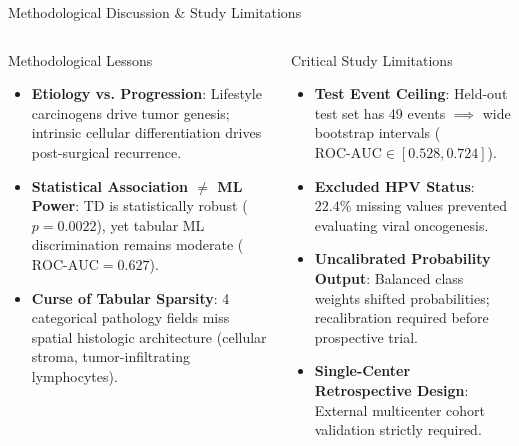 \documentclass[10pt,aspectratio=169,xcolor={table,dvipsnames}]{beamer}
\newcommand{\ROC}{\text{ROC-AUC}}
\begin{document}
\begin{frame}{Methodological Discussion \& Study Limitations}
  \begin{columns}[t]
      \begin{block}{Methodological Lessons}
        \begin{itemize}\setlength{\itemsep}{3pt}
          \item \textbf{Etiology vs. Progression}: Lifestyle carcinogens drive tumor genesis; intrinsic cellular differentiation drives post-surgical recurrence.
          \item \textbf{Statistical Association $\neq$ ML Power}: TD is statistically robust ($p=0.0022$), yet tabular ML discrimination remains moderate ($\ROC = 0.627$).
          \item \textbf{Curse of Tabular Sparsity}: 4 categorical pathology fields miss spatial histologic architecture (cellular stroma, tumor-infiltrating lymphocytes).
        \end{itemize}
      \end{block}

      \begin{alertblock}{Critical Study Limitations}
        \begin{itemize}\setlength{\itemsep}{2pt}
          \item \textbf{Test Event Ceiling}: Held-out test set has 49 events $\implies$ wide bootstrap intervals ($\ROC \in [0.528, 0.724]$).
          \item \textbf{Excluded HPV Status}: $22.4\%$ missing values prevented evaluating viral oncogenesis.
          \item \textbf{Uncalibrated Probability Output}: Balanced class weights shifted probabilities; recalibration required before prospective trial.
          \item \textbf{Single-Center Retrospective Design}: External multicenter cohort validation strictly required.
        \end{itemize}
      \end{alertblock}
  \end{columns}
\end{frame}
\end{document}
